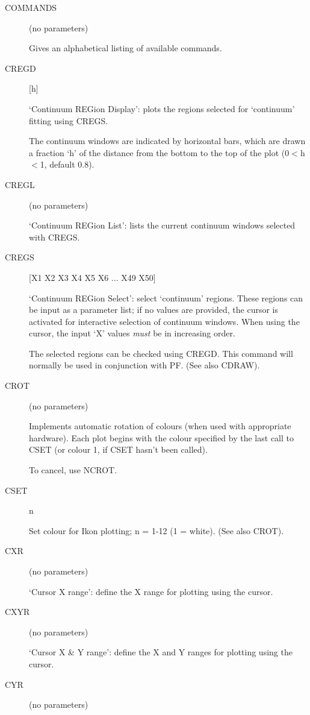 \begin {description}
\item [COMMANDS] (no parameters)

Gives an alphabetical listing of available commands.

\item [CREGD] [h]

`Continuum REGion Display': plots the regions selected for `continuum'
fitting using CREGS.

The continuum windows are indicated by horizontal bars, which are
drawn a fraction `h' of the distance from the bottom to the top of the
plot (0$<$h$<$1, default 0.8).

\item [CREGL] (no parameters)

`Continuum REGion List': lists the current continuum windows selected
with CREGS.

\item [CREGS] [X1 X2  X3 X4  X5 X6 ... X49 X50]

`Continuum REGion Select': select `continuum' regions. These regions
can be input as a parameter list; if no values are provided, the
cursor is activated for interactive selection of continuum windows.
When using the cursor, the input `X' values {\em must} be in
increasing order.

The selected regions can be checked using CREGD. This command will
normally be used in conjunction with PF. (See also CDRAW).

\item [CROT] (no parameters)

Implements automatic rotation of colours (when used with appropriate
hardware). Each plot begins with the colour specified by the last call
to CSET (or colour 1, if CSET hasn't been called).

To cancel, use NCROT.

\item [CSET] n

Set colour for Ikon plotting; n = 1-12 (1 = white). (See also CROT).

\item [CXR] (no parameters)

`Cursor X range': define the X range for plotting using the cursor.

\item [CXYR] (no parameters)

`Cursor X \& Y range': define the X and Y ranges for plotting using
the cursor.

\item [CYR] (no parameters)


\end{description}
